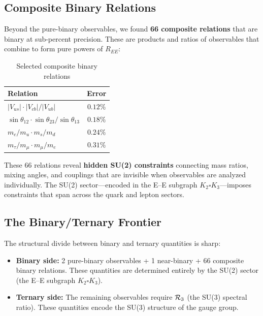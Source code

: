 \subsection{Composite Binary Relations}\label{sec:composite_binary}

Beyond the pure-binary observables, we found \textbf{66 composite relations} that are binary at sub-percent precision. These are products and ratios of observables that combine to form pure powers of $R_{EE}$:

\begin{table}[h]
\centering
\caption{Selected composite binary relations}
\label{tab:composite_binary}
\begin{tabular}{lc}
\hline\hline
Relation & Error \\
\hline
$|V_{us}| \cdot |V_{cb}| / |V_{ub}|$ & $0.12\%$ \\
$\sin\theta_{12} \cdot \sin\theta_{23} / \sin\theta_{13}$ & $0.18\%$ \\
$m_c/m_u \cdot m_s/m_d$ & $0.24\%$ \\
$m_\tau/m_\mu \cdot m_\mu/m_e$ & $0.31\%$ \\
\hline\hline
\end{tabular}
\end{table}

These 66 relations reveal \textbf{hidden SU(2) constraints} connecting mass ratios, mixing angles, and couplings that are invisible when observables are analyzed individually. The SU(2) sector---encoded in the E--E subgraph $K_2 \square K_3$---imposes constraints that span across the quark and lepton sectors.

\subsection{The Binary/Ternary Frontier}\label{sec:frontier}

The structural divide between binary and ternary quantities is sharp:

\begin{itemize}
\item \textbf{Binary side:} 2 pure-binary observables + 1 near-binary + 66 composite binary relations. These quantities are determined entirely by the SU(2) sector (the E--E subgraph $K_2 \square K_3$).
\item \textbf{Ternary side:} The remaining observables require $\mathcal{R}_3$ (the SU(3) spectral ratio). These quantities encode the SU(3) structure of the gauge group.
\end{itemize}

